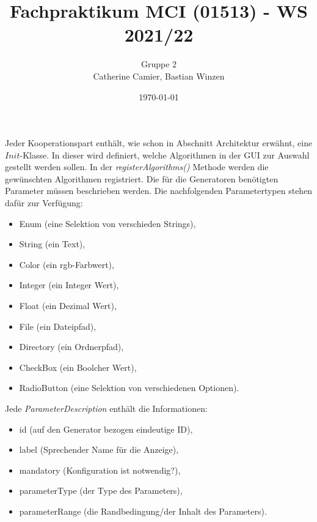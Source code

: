 \documentclass[../mciAusarbeitung.tex]{subfiles}
\title{Fachpraktikum MCI (01513) - WS 2021/22}
\author{Gruppe 2\\
	Catherine Camier, Bastian Winzen}
\date{\today}
\begin{document}
Jeder Kooperationspart enthält, wie schon in Abschnitt Architektur erwähnt, eine $Init$-Klasse. In dieser wird definiert, welche Algorithmen in der GUI zur Auswahl gestellt werden sollen. In der \textit{registerAlgorithms()} Methode werden die gewünschten Algorithmen registriert. Die für die Generatoren benötigten Parameter müssen beschrieben werden. Die nachfolgenden Parametertypen stehen dafür zur Verfügung:
\begin{itemize}
\setlength\itemsep{-0.5em}
\item Enum (eine Selektion von verschieden Strings),
\item String (ein Text),
\item Color (ein rgb-Farbwert),
\item Integer (ein Integer Wert),
\item Float (ein Dezimal Wert),
\item File (ein Dateipfad),
\item Directory (ein Ordnerpfad),
\item CheckBox (ein Boolcher Wert),
\item RadioButton (eine Selektion von verschiedenen Optionen).
\end{itemize}

Jede \textit{ParameterDescription} enthält die Informationen:
\begin{itemize}
\setlength\itemsep{-0.5em}
\item id (auf den Generator bezogen eindeutige ID),
\item label (Sprechender Name für die Anzeige),
\item mandatory (Konfiguration ist notwendig?),
\item parameterType (der Type des Parameters),
\item parameterRange (die Randbedingung/der Inhalt des Parameters).
\end{itemize}
\end{document}

